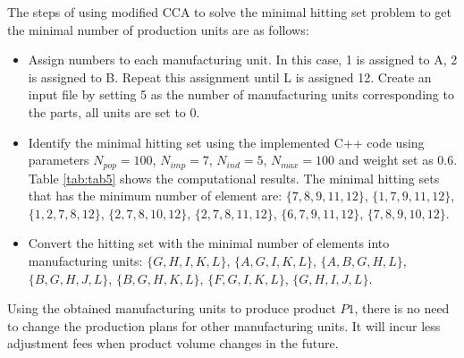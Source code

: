 The steps of using modified CCA to solve the minimal hitting set problem  to get the minimal number of production units are as follows:
\begin{itemize}
	\item Assign numbers to each manufacturing unit. In this case, 1 is assigned to A, 2 is assigned to B. Repeat this assignment until L is assigned 12. Create an input file by setting 5 as the number of manufacturing units corresponding to the parts, all units are set to 0.
	\item Identify the minimal hitting set using the implemented C++ code using parameters $N_{pop} = 100$, $N_{imp} = 7$, $N_{ind} = 5$, $N_{max} = 100$ and weight set as 0.6. Table \ref{tab:tab5} shows the computational results.
	The minimal hitting sets that has the minimum number of element are: $\{7,8,9,11,12\}$,  $\{1,7,9,11,12\}$, $\{1,2,7,8,12\}$, $\{2,7,8,10,12\}$, $\{2,7,8,11,12\}$, $\{6,7,9,11,12\}$, $\{7,8,9,10,12\}$.
	\item Convert the hitting set with the minimal number of elements into manufacturing units: $\{G,H,I,K,L\}$, $\{A,G,I,K,L\}$, $\{A,B,G,H,L\}$, $\{B,G,H,J,L\}$, $\{B,G,H,K,L\}$, $\{F,G,I,K,L\}$, $\{G,H,I,J,L\}$.
\end{itemize}

Using the obtained manufacturing units to produce product $P1$, there is no need to change the production plans for other manufacturing units.
It will incur less adjustment fees when product volume changes in the future.

